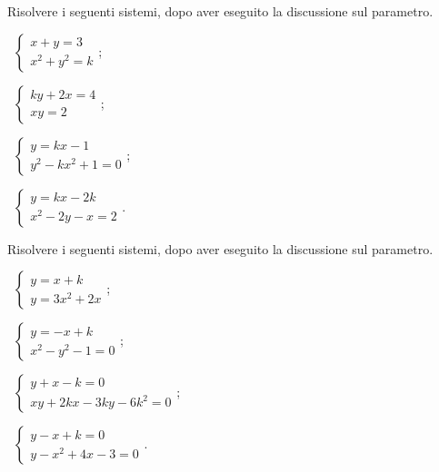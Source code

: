 \begin{esercizio}[\Ast]
 \label{ese:6.8}
Risolvere i seguenti sistemi, dopo aver eseguito la discussione sul parametro.
\begin{multicols}{2}
 \begin{enumeratea}
 \item~$\left\{\begin{array}{l}x+y=3 \\x^2+y^2=k \end{array}\right.$;
 \item~$ \left\{\begin{array}{l}ky+2x=4\\xy=2\end{array}\right. $;
 \item~$ \left\{\begin{array}{l}y=kx-1 \\y^2-kx^2+1=0\end{array}\right. $;
 \item~$\left\{\begin{array}{l}y=kx-2k \\x^2-2y-x=2\end{array}\right.$.
 \end{enumeratea}
 \end{multicols}
\end{esercizio}

\begin{esercizio}[\Ast]
 \label{ese:6.9}
Risolvere i seguenti sistemi, dopo aver eseguito la discussione sul parametro.
\begin{multicols}{2}
 \begin{enumeratea}
 \item~$\left\{\begin{array}{l}y=x+k \\y=3x^2+2x\end{array}\right.$;
 \item~$ \left\{\begin{array}{l}y=-x+k \\x^2-y^2-1=0\end{array}\right. $;
 \item~$\left\{\begin{array}{l}y+x-k=0 \\{xy}+2{kx}-3{ky}-6k^2=0\end{array}\right.$;
 \item~$ \left\{\begin{array}{l}y-x+k=0 \\y-x^2+4x-3=0\end{array}\right. $.
 \end{enumeratea}
 \end{multicols}
\end{esercizio}

